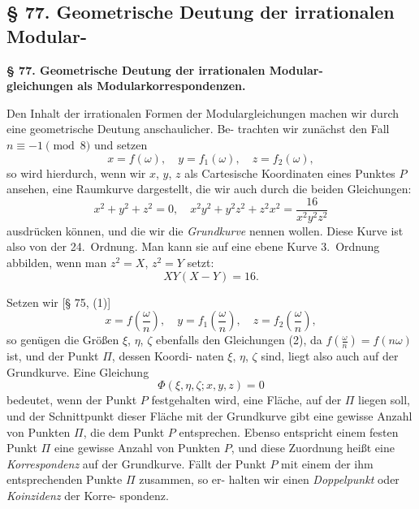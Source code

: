\documentclass[12pt,a4paper]{article}
\theoremstyle{definition}
\begin{document}
\subsection*{\S{} 77. Geometrische Deutung der irrationalen Modular-}
\begin{center}
\textbf{\S{} 77. Geometrische Deutung der irrationalen Modular-}\\
\textbf{gleichungen als Modularkorrespondenzen.}
\end{center}

Den Inhalt der irrationalen Formen der Modulargleichungen
machen wir durch eine geometrische Deutung anschaulicher. Be-
trachten wir zun\"achst den Fall $n \equiv -1 \pmod{8}$ und setzen
\begin{equation}\tag{1}
x = f(\omega), \quad y = f_1(\omega), \quad z = f_2(\omega),
\end{equation}
so wird hierdurch, wenn wir $x$, $y$, $z$ als Cartesische Koordinaten
eines Punktes $P$ ansehen, eine Raumkurve dargestellt, die wir
auch durch die beiden Gleichungen:
\begin{equation}\tag{2}
x^2 + y^2 + z^2 = 0, \quad x^2 y^2 + y^2 z^2 + z^2 x^2 = \frac{16}{x^2 y^2 z^2}
\end{equation}
ausdr\"ucken k\"onnen, und die wir die \textit{Grundkurve} nennen wollen.
Diese Kurve ist also von der 24.~Ordnung. Man kann sie auf
eine ebene Kurve 3.~Ordnung abbilden, wenn man $z^2 = X$,
$z^2 = Y$ setzt:
\begin{equation}\tag{3}
XY(X - Y) = 16.
\end{equation}

Setzen wir [\S{} 75, (1)]
\begin{equation}\tag{4}
x = f\left(\frac{\omega}{n}\right), \quad y = f_1\left(\frac{\omega}{n}\right), \quad z = f_2\left(\frac{\omega}{n}\right),
\end{equation}
so gen\"ugen die Gr\"o\ss en $\xi$, $\eta$, $\zeta$ ebenfalls den Gleichungen (2), da
$f(\frac{\omega}{n}) = f(n\omega)$ ist, und der Punkt $\Pi$, dessen Koordi-
naten $\xi$, $\eta$, $\zeta$ sind, liegt also auch auf der Grundkurve.
Eine Gleichung
\begin{equation}\tag{5}
\Phi(\xi, \eta, \zeta; x, y, z) = 0
\end{equation}
bedeutet, wenn der Punkt $P$ festgehalten wird, eine Fl\"ache, auf
der $\Pi$ liegen soll, und der Schnittpunkt dieser Fl\"ache mit der
Grundkurve gibt eine gewisse Anzahl von Punkten $\Pi$, die dem
Punkt $P$ entsprechen. Ebenso entspricht einem festen Punkt $\Pi$
eine gewisse Anzahl von Punkten $P$, und diese Zuordnung hei\ss t
eine \textit{Korrespondenz} auf der Grundkurve. F\"allt der Punkt $P$
mit einem der ihm entsprechenden Punkte $\Pi$ zusammen, so er-
halten wir einen \textit{Doppelpunkt} oder \textit{Koinzidenz} der Korre-
spondenz.
\end{document}
